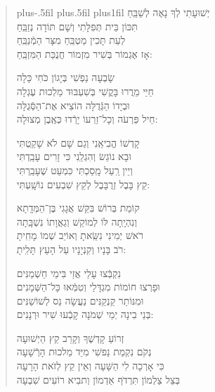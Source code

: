 \documentclass[twoside, openany, parskip=half, 11pt]{book}
\begin{document}
\begin{quote}
\leftskip=0pt plus-.5fil
		\rightskip=0pt plus.5fil
		\parfillskip=0pt plus1fil
 יְשׁוּעָתִי \hfill לְךָ נָאֶה לְשַׁבֵּֽחַ \\ 	תִּכּוֹן בֵּית תְּפִלָּתִי \hfill וְשָׁם תּוֹדָה נְזַבֵּֽחַ \\
לְעֵת תָּכִין מַטְבֵּֽחַ \hfill מִצָּר הַמְֿנַבֵּֽחַ \\	אָז אֶגְמוֹר בְּשִׁיר מִזְמוֹר \hfill חֲנֻכַּת הַמִּזְבֵּֽחַ:

 שָׂבְעָה נַפְשִׁי \hfill בְּיָגוֹן כֹּחִי כָּלָה \\	חַיַּי מֵרֲרוּ בָּקֳשִׁי \hfill בְּשִׁעְבּוּד מַלְכוּת עֶגְלָה \\
וּבְיָדוֹ הַגְּֿדֻלָּה \hfill הוֹצִיא אֶת־הַסְּֿגֻלָּה \\	חֵיל פַּרְעֹה וְכָל־זַרְעוֹ \hfill יָרְֿדוּ כְּאֶֽבֶן מְצוּלָה:

 קָדְשׁוֹ הֱבִיאַֽנִי \hfill וְגַם שָׁם לֹא שָׁקַֽטְתִּי \\	וּבָא נוֹגֵשׂ וְהִגְלַֽנִי \hfill כִּי זָרִים עָבַֽדְתִּי \\
וְיֵין רַֽעַל מָֽסַכְתִּי \hfill כִּמְעַט שֶׁעָבַֽרְתִּי \\	קֵץ בָּבֶל זְרֻבָּבֶל \hfill לְקֵץ שִׁבְעִים נוֹשָֽׁעְתִּי:

 קוֹמַת בְּרוֹשׁ בִּקֵּשׁ \hfill אֲגָגִי בֶּן־הַמְּדָֽתָא \\ 	וְנִהְיָֽתָה לּוֹ לְמוֹקֵשׁ \hfill וְגַאֲוָתוֹ נִשְׁבָּֽתָה \\
רֹאשׁ יְמִינִי נִשֵּֽׂאתָ \hfill וְאוֹיֵב שְׁמוֹ מָחִֽיתָ \\	רֹב בָּנָיו וְקִנְיָנָיו \hfill עַל הָעֵץ תָּלִֽיתָ:

 נִקְבְּֿצוּ עָלַי \hfill אֲזַי בִּימֵי חַשְׁמַנִּים \\	וּפָרְצוּ חוֹמוֹת מִגְדָּלַי \hfill וְטִמְּֿאוּ כָּל־הַשְּׁמָנִים \\
וּמִנּוֹתַר קַנְקַנִּים \hfill נַעֲשָׂה נֵס לְשׁוֹשַׁנִּים \\	בְּנֵי בִינָה יְמֵי שְׁמֹנָה \hfill קָבְֿעוּ שִׁיר וּרְנָנִים:


 זְרוֹעַ קָדְשֶׁךָ \hfill וְקָרֵב קֵץ הַיְשׁוּעָה\\
נְקֹם נִקְמַת נַפשִׁי \hfill מִיַּד מַלכוּת הָרְֿשָׁעָה\\
כִּי אָרְכָה לִי הַשָּׁעָה \hfill וְאֵין קֵץ לְזׂאת הָרָעָה\\
בְּצֵל צַלְמוֹן תִּרְדּׂף אַדְמוֹן \hfill וְתבִיא רוֹעִים שִׁבְעָה

\end{quote}
\end{document}

